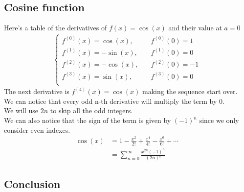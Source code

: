 \documentclass{article}
\begin{document}
\subsection{Cosine function}

Here's a table of the derivatives of \(f(x)=\cos(x)\) and their value at \(a=0\)
\begin{align*}
	\begin{cases}
		f^{(0)}(x)=\cos(x), \quad &f^{(0)}(0)=1 \\
		f^{(1)}(x)=-\sin(x),\quad &f^{(1)}(0)=0 \\
		f^{(2)}(x)=-\cos(x),\quad &f^{(2)}(0)=-1\\
		f^{(3)}(x)=\sin(x), \quad &f^{(3)}(0)=0 \\
	\end{cases}
\end{align*}
The next derivative is \(f^{(4)}(x)=\cos(x)\) making the sequence start over.
\\
We can notice that every odd n-th derivative will multiply the term by \(0\).
\\
We will use \(2n\) to skip all the odd integers.
\\
We can also notice that the sign of the term is given by \((-1)^n\) since we only consider even indexes.
\begin{align*}
	\cos(x)&=1-\frac{x^2}{2!}+\frac{x^4}{4!}-\frac{x^6}{6!}+\cdots
	\\
	&=\sum_{n=0}^{\infty}\frac{x^{2n}(-1)^n}{(2n)!}
\end{align*}

\pagebreak

\subsection{Conclusion}
\end{document}
